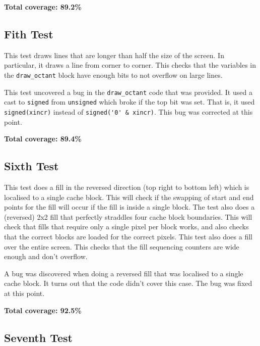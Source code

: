 \documentclass[]{article}
\begin{document}
\textbf{Total coverage: 89.2\%}


\subsection{Fith Test} %
\label{sub:fith_test}

This test draws lines that are longer than half the size of the screen. In particular, it draws a line from corner to corner. This checks that the variables in the \verb"draw_octant" block have enough bits to not overflow on large lines.

This test uncovered a bug in the \verb"draw_octant" code that was provided. It used a cast to \verb"signed" from \verb"unsigned" which broke if the top bit was set. That is, it used \verb"signed(xincr)" instead of \verb"signed('0' & xincr)". This bug was corrected at this point.

\textbf{Total coverage: 89.4\%}


\subsection{Sixth Test} %
\label{sub:sixth_test}

This test does a fill in the reversed direction (top right to bottom left) which is localised to a single cache block. This will check if the swapping of start and end points for the fill will occur if the fill is inside a single block.
The test also does a (reversed) 2x2 fill that perfectly straddles four cache block boundaries. This will check that fills that require only a single pixel per block works, and also checks that the correct blocks are loaded for the correct pixels.
This test also does a fill over the entire screen. This checks that the fill sequencing counters are wide enough and don't overflow.

A bug was discovered when doing a reversed fill that was localised to a single cache block. It turns out that the code didn't cover this case. The bug was fixed at this point.

\textbf{Total coverage: 92.5\%}


\subsection{Seventh Test} %
\label{sub:seventh_test}
\end{document}
